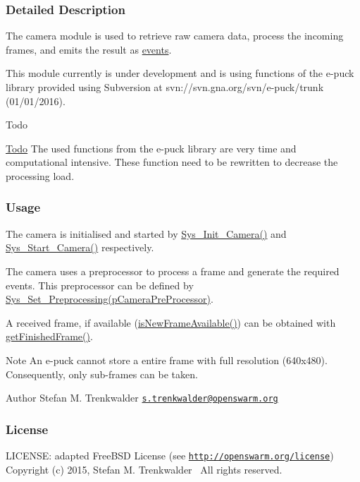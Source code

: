 \subsubsection{Detailed Description}
The camera module is used to retrieve raw camera data, process the incoming frames, and emits the result as \hyperlink{group__events}{events}. 

This module currently is under development and is using functions of the e-\/puck library provided using Subversion at svn\+://svn.gna.\+org/svn/e-\/puck/trunk (01/01/2016).

\begin{DoxyRefDesc}{Todo}
\item[\hyperlink{todo__todo000005}{Todo}]The used functions from the e-\/puck library are very time and computational intensive. These function need to be rewritten to decrease the processing load.\end{DoxyRefDesc}
\hypertarget{group__camera_camera_usage}{}\subsubsection{Usage}\label{group__camera_camera_usage}
The camera is initialised and started by \hyperlink{camera_8h_aeefbe8dd86aa2b4588e5e5aa596d41fe}{Sys\+\_\+\+Init\+\_\+\+Camera()} and \hyperlink{camera_8h_ac44e432642eee885441e01f976e2c969}{Sys\+\_\+\+Start\+\_\+\+Camera()} respectively.

The camera uses a preprocessor to process a frame and generate the required events. This preprocessor can be defined by \hyperlink{camera_8h_ac93ec56d124a0811e638208ad64ed14c}{Sys\+\_\+\+Set\+\_\+\+Preprocessing(p\+Camera\+Pre\+Processor)}.

A received frame, if available (\hyperlink{camera_8h_a1b0543ca3f9389e59135838a3c9cbb23}{is\+New\+Frame\+Available()}) can be obtained with \hyperlink{camera_8h_a72c1d6c27d3aeb8399ec41247cc4ba58}{get\+Finished\+Frame()}.

\begin{DoxyNote}{Note}
An e-\/puck cannot store a entire frame with full resolution (640x480). Consequently, only sub-\/frames can be taken.
\end{DoxyNote}
\begin{DoxyAuthor}{Author}
Stefan M. Trenkwalder \href{mailto:s.trenkwalder@openswarm.org}{\tt s.\+trenkwalder@openswarm.\+org}
\end{DoxyAuthor}
\hypertarget{group__camera_camera_license}{}\subsubsection{License}\label{group__camera_camera_license}
L\+I\+C\+E\+N\+S\+E\+: adapted Free\+B\+S\+D License (see \href{http://openswarm.org/license}{\tt http\+://openswarm.\+org/license})~\newline
Copyright (c) 2015, Stefan M. Trenkwalder~\newline
All rights reserved. 